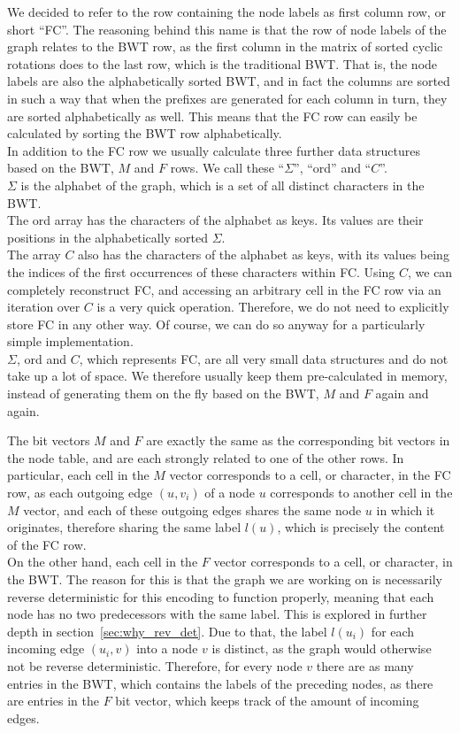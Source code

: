 \documentclass[a4paper,12pt,twoside,BCOR=10mm]{scrbook}
\begin{document}
We decided to refer to the row containing the node labels as first column row, or short “FC”.
The reasoning behind this name is that the row of node labels of the graph relates to the BWT row,
as the first column in the matrix of sorted cyclic rotations does to the last row, which is the traditional BWT.
That is, the node labels are also the alphabetically sorted BWT, and in fact the columns are sorted in such a
way that when the prefixes are generated for each column in turn, they are sorted alphabetically as well.
This means that the FC row can easily be calculated by sorting the BWT row alphabetically. \\
In addition to the FC row
we usually calculate three further data structures based
on the BWT, $ M $ and $ F $ rows.
We call these “$ \Sigma $”, “ord” and “$ C $”. \\
$ \Sigma $ is the alphabet of the graph, which is a set of all distinct characters in the BWT. \\
The ord array has the characters of the alphabet as keys. 
Its values are their positions in the alphabetically sorted $ \Sigma $. \\
The array $ C $ also has the characters of the alphabet as keys, 
with its values being the indices of the first occurrences of these characters within FC.
Using $ C $, we can completely reconstruct FC, and accessing an arbitrary cell in the FC row
via an iteration over $ C $ is a very quick operation.
Therefore, we do not need to explicitly store FC in any other way.
Of course, we can do so anyway for a particularly simple implementation. \\
$ \Sigma $, ord and $ C $, which represents FC, are all very small data structures and do not take up a lot of space.
We therefore usually keep them pre-calculated in memory,
instead of generating them on the fly based on the BWT, $ M $ and $ F $ again and again.

The bit vectors $ M $ and $ F $ are exactly the same as the corresponding bit vectors in the node table,
and are each strongly related to one of the other rows.
In particular, each cell in the $ M $ vector corresponds to a cell, or character, in the FC row,
as each outgoing edge $ (u, v_i) $ of a node $ u $ corresponds to another cell in the $ M $ vector, and each
of these outgoing edges shares the same node $ u $ in which it originates, therefore sharing the same label $ l ( u ) $,
which is precisely the content of the FC row. \\
On the other hand, each cell in the $ F $ vector corresponds to a cell, or character, in the BWT.
The reason for this is that the graph we are working on is necessarily reverse deterministic
for this encoding to function properly, meaning that each node has no two predecessors with the same label.
This is explored in further depth in section~\ref{sec:why_rev_det}.
Due to that, the label $ l (u_i) $ for each incoming edge $ (u_i, v) $ into a node $ v $ is distinct,
as the graph would otherwise not be reverse deterministic.
Therefore, for every node $ v $ there are as many entries in the BWT, which contains the labels of the preceding nodes,
as there are entries in the $ F $ bit vector, which keeps track of the amount of incoming edges.
\end{document}

